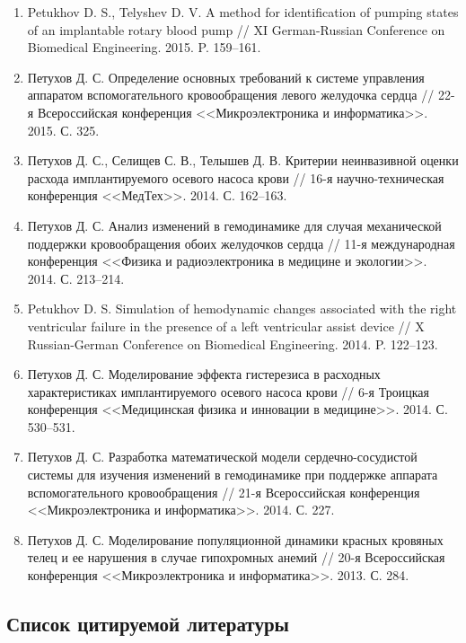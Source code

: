 \begin{enumerate}[leftmargin=25pt, itemsep=12pt]
  \item Petukhov D. S., Telyshev D. V. A method for identification of pumping states of an implantable rotary blood pump // XI German-Russian Conference on Biomedical Engineering. 2015. P. 159--161.
  \item Петухов Д. С. Определение основных требований к системе управления аппаратом вспомогательного кровообращения левого желудочка сердца // 22-я Всероссийская конференция <<Микроэлектроника и информатика>>. 2015. С. 325.
  \item Петухов Д. С., Селищев С. В., Телышев Д. В. Критерии неинвазивной оценки расхода имплантируемого осевого насоса крови // 16-я научно-техническая конференция <<МедТех>>. 2014. С. 162--163.
  \item Петухов Д. С. Анализ изменений в гемодинамике для случая механической поддержки кровообращения обоих желудочков сердца // 11-я международная конференция <<Физика и радиоэлектроника в медицине и экологии>>. 2014. С. 213--214.
  \item Petukhov D. S. Simulation of hemodynamic changes associated with the right ventricular failure in the presence of a left ventricular assist device // X Russian-German Conference on Biomedical Engineering. 2014. P. 122--123.
  \item Петухов Д. С. Моделирование эффекта гистерезиса в расходных характеристиках имплантируемого осевого насоса крови // 6-я Троицкая конференция <<Медицинская физика и инновации в медицине>>. 2014. С. 530--531.
  \item Петухов Д. С. Разработка математической модели сердечно-сосудистой системы для изучения изменений в гемодинамике при поддержке аппарата вспомогательного кровообращения // 21-я Всероссийская конференция <<Микроэлектроника и информатика>>. 2014. С. 227.
  \item Петухов Д. С. Моделирование популяционной динамики красных кровяных телец и ее нарушения в случае гипохромных анемий // 20-я Всероссийская конференция <<Микроэлектроника и информатика>>. 2013. С. 284.
\end{enumerate}

\subsection*{Список цитируемой литературы}

